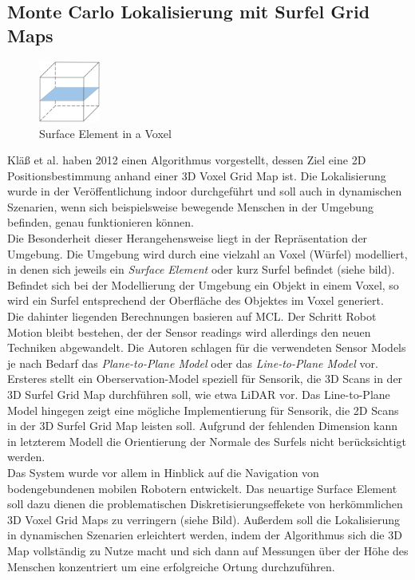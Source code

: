 \subsection{Monte Carlo Lokalisierung mit Surfel Grid Maps}\label{subsec:mcl_surfel}
\begin{figure}
    \centering
    \includegraphics[width=0.18\textwidth]{pic/loesungen/12_surfel.png}
    \caption{Surface Element in a Voxel}
    \label{fig:surfel}
\end{figure}
Kläß et al. \cite{3DsurfelGridMaps} haben 2012 einen Algorithmus vorgestellt, dessen Ziel eine 2D Positionsbestimmung anhand einer 3D Voxel Grid Map ist. Die Lokalisierung wurde in der Veröffentlichung indoor durchgeführt und soll auch in dynamischen Szenarien, wenn sich beispielsweise bewegende Menschen in der Umgebung befinden, genau funktionieren können.\\
Die Besonderheit dieser Herangehensweise liegt in der Repräsentation der Umgebung. Die Umgebung wird durch eine vielzahl an Voxel (Würfel) modelliert, in denen sich jeweils ein \textit{Surface Element} oder kurz Surfel befindet (siehe bild). Befindet sich bei der Modellierung der Umgebung ein Objekt in einem Voxel, so wird ein Surfel entsprechend der Oberfläche des Objektes im Voxel generiert.\\
Die dahinter liegenden Berechnungen basieren auf MCL. Der Schritt Robot Motion bleibt bestehen, der der Sensor readings wird allerdings den neuen Techniken abgewandelt. Die Autoren schlagen für die verwendeten Sensor Models je nach Bedarf das \textit{Plane-to-Plane Model} oder das \textit{Line-to-Plane Model} vor. Ersteres stellt ein Oberservation-Model speziell für Sensorik, die 3D Scans in der 3D Surfel Grid Map durchführen soll, wie etwa LiDAR vor. Das Line-to-Plane Model hingegen zeigt eine mögliche Implementierung für Sensorik, die 2D Scans in der 3D Surfel Grid Map leisten soll. Aufgrund der fehlenden Dimension kann in letzterem Modell die Orientierung der Normale des Surfels nicht berücksichtigt werden.\\
Das System wurde vor allem in Hinblick auf die Navigation von bodengebundenen mobilen Robotern entwickelt. Das neuartige Surface Element soll dazu dienen die problematischen Diskretisierungseffekete von herkömmlichen 3D Voxel Grid Maps zu verringern (siehe Bild). Außerdem soll die Lokalisierung in dynamischen Szenarien erleichtert werden, indem der Algorithmus sich die 3D Map vollständig zu Nutze macht und sich dann auf Messungen über der Höhe des Menschen konzentriert um eine erfolgreiche Ortung durchzuführen.
